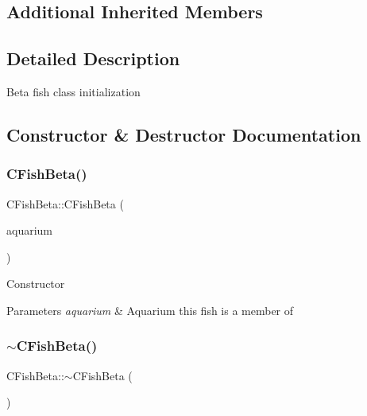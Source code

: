 \subsection*{Additional Inherited Members}


\subsection{Detailed Description}
Beta fish class initialization 

\subsection{Constructor \& Destructor Documentation}
\mbox{\label{class_c_fish_beta_a021073e2e0034271cd7e776b1e3fed29}} 
\subsubsection{\texorpdfstring{C\+Fish\+Beta()}{CFishBeta()}}
{\footnotesize\ttfamily C\+Fish\+Beta\+::\+C\+Fish\+Beta (\begin{DoxyParamCaption}\item[{\mbox{\hyperlink{class_c_aquarium}{C\+Aquarium}} $\ast$}]{aquarium }\end{DoxyParamCaption})}

Constructor 
\begin{DoxyParams}{Parameters}
{\em aquarium} & Aquarium this fish is a member of \\
\hline
\end{DoxyParams}
\mbox{\label{class_c_fish_beta_abd932894ad25a70f03c79c4f0f00fff4}} 
\subsubsection{\texorpdfstring{$\sim$\+C\+Fish\+Beta()}{~CFishBeta()}}
{\footnotesize\ttfamily C\+Fish\+Beta\+::$\sim$\+C\+Fish\+Beta (\begin{DoxyParamCaption}{ }\end{DoxyParamCaption})\hspace{0.3cm}{\ttfamily [virtual]}}

